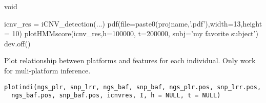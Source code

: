 \documentclass[a4paper]{book}
\begin{document}
%
\begin{Value}
void
\end{Value}
%
\begin{Examples}
\begin{ExampleCode}
icnv_res = iCNV_detection(...)
pdf(file=paste0(projname,'.pdf'),width=13,height = 10)
plotHMMscore(icnv_res,h=100000, t=200000, subj='my favorite subject')
dev.off()
\end{ExampleCode}
\end{Examples}
%
\begin{Description}\relax
Plot relationship between platforms and features for each individual. Only work for muli-platform inference.
\end{Description}
%
\begin{Usage}
\begin{verbatim}
plotindi(ngs_plr, snp_lrr, ngs_baf, snp_baf, ngs_plr.pos, snp_lrr.pos,
  ngs_baf.pos, snp_baf.pos, icnvres, I, h = NULL, t = NULL)
\end{verbatim}
\end{Usage}
%
\end{document}
